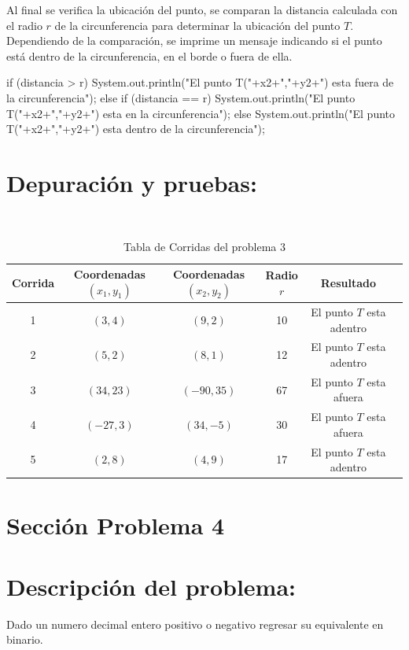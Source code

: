 \documentclass{IEEEcsmag}
\begin{document}
Al final se verifica la ubicación del punto, se comparan la distancia calculada con el radio $r$ de la circunferencia para determinar la ubicación del punto $T$. 
Dependiendo de la comparación, se imprime un mensaje indicando si el punto está dentro de la circunferencia, en el borde o fuera de ella.
\begin{javacode}
if (distancia > r) {
     System.out.println("El punto T("+x2+","+y2+") esta fuera de la circunferencia");
     }else if (distancia == r) {
     System.out.println("El punto T("+x2+","+y2+") esta en la circunferencia");
    }else{
     System.out.println("El punto T("+x2+","+y2+") esta dentro de la circunferencia");
    }
\end{javacode}


\section*{Depuración y pruebas:}
\begin{table}[h!]
     \centering
     \caption{Tabla de Corridas del problema 3}\\

     \begin{tabular}{|c|c|c|c|c|c|}
     \hline
    Corrida & Coordenadas $(x_{1}, y_{1})$& Coordenadas $(x_{2}, y_{2})$  &  Radio $r$ & Resultado\\
    \hline
    1  &  $(3,4)$ & $(9,2)$ & 10 & El punto $T$ esta adentro \\
    \hline
    2  &  $(5,2)$ & $(8,1)$ & 12 & El punto $T$ esta adentro \\
    \hline
    3  &  $(34,23)$ & $(-90,35)$ & 67 & El punto $T$ esta afuera \\
    \hline
    4  &  $(-27,3)$ & $(34,-5)$ & 30 & El punto $T$ esta afuera \\
    \hline
    5 &  $(2,8)$ & $(4,9)$ & 17 & El punto $T$ esta adentro \\
    \hline
     \end{tabular}
     \label{tab:my_label}
 \end{table}
\clearpage








\section{Sección Problema 4}
\section*{Descripción del problema:}
Dado un numero decimal entero positivo o negativo regresar su equivalente en binario.
\newline
\end{document}
